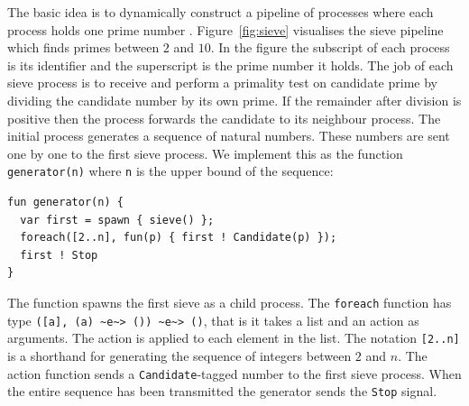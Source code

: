 \documentclass[12pt,mscres,cdtppar,twoside,openright,logo,rightchapter,normalheadings]{infthesis}
\theoremstyle{definition}
\begin{document}
The basic idea is to dynamically construct a pipeline of processes
where each process holds one prime number
\citep{Andrews2000}. Figure~\ref{fig:sieve} visualises the sieve
pipeline which finds primes between $2$ and $10$. In the figure the
subscript of each process is its identifier and the superscript is the
prime number it holds. The job of each sieve process is to receive and
perform a primality test on candidate prime by dividing the candidate
number by its own prime. If the remainder after division is positive
then the process forwards the candidate to its neighbour process. The
initial process generates a sequence of natural numbers. These numbers
are sent one by one to the first sieve process. We implement this as
the function \lstinline$generator(n)$ where \lstinline$n$ is the upper
bound of the sequence:
%
\begin{lstlisting}
fun generator(n) {
  var first = spawn { sieve() };
  foreach([2..n], fun(p) { first ! Candidate(p) });
  first ! Stop
}
\end{lstlisting}
%
The function spawns the first sieve as a child process. The
\lstinline$foreach$ function has type
\lstinline$([a], (a) ~e~> ()) ~e~> ()$, that is it takes a list and an
action as arguments. The action is applied to each element in the
list. The notation \lstinline$[2..n]$ is a shorthand for generating
the sequence of integers between $2$ and $n$. The action function
sends a \lstinline$Candidate$-tagged number to the first sieve
process. When the entire sequence has been transmitted the generator
sends the \lstinline$Stop$ signal.
\end{document}
